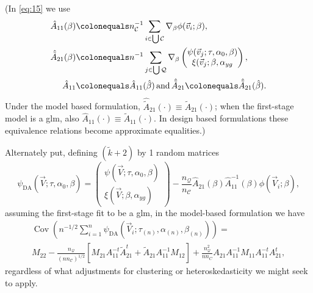 \documentclass{article}
\newcommand{\defeq}{\ensuremath{\colonequals}}
\begin{document}
(In \eqref{eq:15}
we use
\begin{align*}
  \hat{A}_{11}(\beta) &\defeq  n_{\mathcal{C}}^{-1}\sum_{i\in \bigcup
        \mathcal{C}}\nabla_{\beta}\phi(\vec{v}_{i};
        \beta ),\\
  \hat{\tilde{A}}_{21}(\beta) &\defeq n^{-1}\sum_{j\in \bigcup
        \mathcal{Q}}\nabla_{\beta}\begin{pmatrix}\psi(\vec{v}_{j};
        \tau, \alpha_{0}, \beta )\\ \xi(\vec{v}_{j};\beta, \alpha_{yg}\\ \end{pmatrix},\\
  \hat{A}_{11}&\defeq \hat{A}_{11}(\hat\beta)\, \text{and}\, \hat{\tilde{A}}_{21}\defeq \hat{\tilde{A}}_{21}(\hat\beta).
\end{align*}
Under the model based
formulation, $\hat{\tilde{A}}_{21}(\cdot) \equiv \tilde{A}_{21}(\cdot)$; when the
first-stage model is a glm, also $\hat{A}_{11}(\cdot) \equiv
\tilde{A}_{11}(\cdot)$.  In design based formulations these
equivalence relations become approximate equalities.)

Alternately put,
defining $(\tilde{k}+2)$ by 1 random matrices
\begin{equation}\label{eq:10}
    \psi_\text{DA}(\vec{V}; \tau, \alpha_{0},
    \beta) = \begin{pmatrix}\psi (\vec{V}; \tau,\alpha_{0},
    \beta) \\ \xi(\vec{V};\beta, \alpha_{yg}) \end{pmatrix} -
    \frac{n_{\mathcal{Q}}}{n_{\mathcal{C}}}
    \hat{{A}}_{21}(\beta) \hat{A}_{11}^{-1}(\beta)\phi(\vec{V}_{i};
    \beta),
\end{equation}
assuming the first-stage fit to be a glm, in the model-based formulation we have
\begin{multline}
  \operatorname{Cov}\left(n^{-1/2}\sum_{i=1}^{n} \psi_\text{DA}(\vec{V}_{i}; \tau_{(n)},\alpha_{(n)},
    \beta_{(n)})\right) = \\
  M_{22} -
                                 \frac{n_{\mathcal{Q}}}{(n n_{\mathcal{C}})^{1/2}}[M_{21}A_{11}^{-t}\tilde{A}_{21}^t
                                 + \tilde{A}_{21}A_{11}^{-1}M_{12}] +
                                 \frac{n_{\mathcal{Q}}^{2}}{nn_C}{A}_{21}A_{11}^{-1}M_{11}A_{11}^{-t}{A}_{21}^{t}, \label{eq:12}
                               \end{multline}
regardless of what adjustments for
clustering or heteroskedasticity we might seek to apply.
\end{document}
